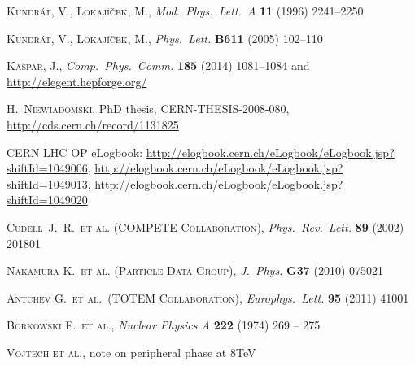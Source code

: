 \documentclass[3p,onecolumn,12pt,times,longtitle]{elsarticle}
\def\etal{et al.}
\def\Name#1{\textsc{#1}, }
\def\REVIEW#1#2#3#4{{\it #1} {\bf #2} (#3) #4}
\begin{document}
\begin{thebibliography}{99}
	\Name{Kundr\' at, V., Lokaj\' i\v cek, M.}
	\REVIEW{Mod.~Phys.~Lett.~A}{11}{1996}{2241--2250}

	\Name{Kundr\' at, V., Lokaj\' i\v cek, M.}
	\REVIEW{Phys.~Lett.}{B611}{2005}{102--110}

	\Name{Ka\v spar, J.}
	\REVIEW{Comp.~Phys.~Comm.}{185}{2014}{1081--1084}
	and \url{http://elegent.hepforge.org/}

	\Name{H.~Niewiadomski}
    PhD thesis, 
    CERN-THESIS-2008-080,
	\url{http://cds.cern.ch/record/1131825}

 CERN LHC OP eLogbook:
	\url{http://elogbook.cern.ch/eLogbook/eLogbook.jsp?shiftId=1049006},
	\url{http://elogbook.cern.ch/eLogbook/eLogbook.jsp?shiftId=1049013}, 
	\url{http://elogbook.cern.ch/eLogbook/eLogbook.jsp?shiftId=1049020}

	\Name{Cudell~J.~R.~\etal{} (COMPETE Collaboration)}
	\REVIEW{Phys.\ Rev.\ Lett.}{89}{2002}{201801}

	\Name{Nakamura K.~\etal{} (Particle Data Group)}
	\REVIEW{J.~Phys.}{G37}{2010}{075021}

	\Name{Antchev G.~\etal{}~(TOTEM Collaboration)}
	\REVIEW{Europhys.~Lett.}{95}{2011}{41001}

	\Name{Borkowski F.~et al.}
	\REVIEW{Nuclear Physics A}{222}{1974}{269 -- 275}

	\Name{Vojtech et al.}
	note on peripheral phase at 8TeV

\end{thebibliography}


\end{document}
